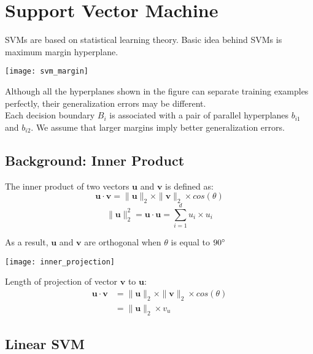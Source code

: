 \chapter{Support Vector Machine}

\begin{multicols*}{2}
\noindent SVMs are based on statistical learning theory. Basic idea behind SVMs is maximum margin
hyperplane.

\begin{center}
\texttt{[image: svm\_margin]}
\end{center}

\noindent Although all the hyperplanes shown in the figure can separate training examples perfectly, their generalization errors may be different. \\

\noindent Each decision boundary $B_i$ is associated with a pair of parallel hyperplanes $b_{i1}$ and $b_{i2}$. We assume that larger margins imply better generalization errors.

\section{Background: Inner Product}

\noindent The inner product of two vectors $\mathbf{u}$ and $\mathbf{v}$ is defined as:
$$\mathbf{u} \cdot \mathbf{v} = \|\mathbf{u} \|_2 \times \|\mathbf{v} \|_2 \times cos(\theta)$$
$$\|\mathbf{u} \|_2^2 = \mathbf{u} \cdot \mathbf{u} = \sum_{i=1}^d u_i \times u_i$$

\noindent As a result, $\mathbf{u}$ and $\mathbf{v}$ are orthogonal when $\theta$ is equal to $90\degree$

\begin{center}
\texttt{[image: inner\_projection]}
\end{center}

\noindent Length of projection of vector $\mathbf{v}$ to $\mathbf{u}$:
\begin{equation*}
\begin{split}
    \mathbf{u} \cdot \mathbf{v} &= \|\mathbf{u} \|_2 \times \|\mathbf{v} \|_2 \times cos(\theta) \\
    &= \|\mathbf{u} \|_2 \times v_u
\end{split}
\end{equation*}

\section{Linear SVM}


\end{multicols*}
